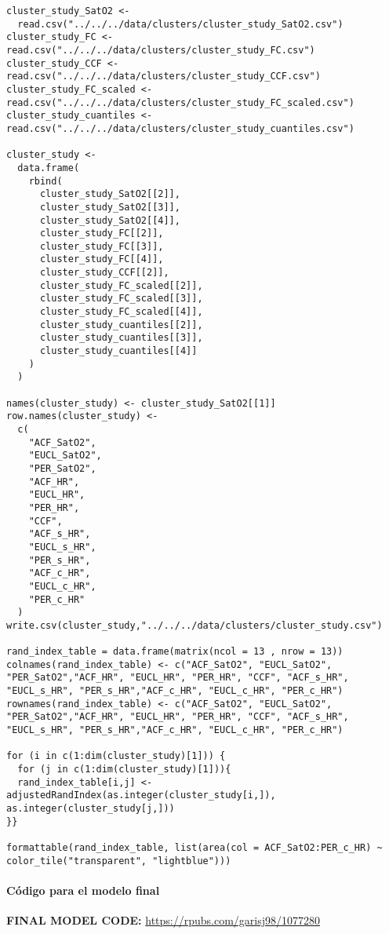 \begin{lstlisting}[style=mystyle,caption={Adjusted Rand Index}, label={lst:input-gower-fun-preprocesamiento}]
    cluster_study_SatO2 <-
  read.csv("../../../data/clusters/cluster_study_SatO2.csv")
cluster_study_FC <- read.csv("../../../data/clusters/cluster_study_FC.csv")
cluster_study_CCF <- read.csv("../../../data/clusters/cluster_study_CCF.csv")
cluster_study_FC_scaled <- read.csv("../../../data/clusters/cluster_study_FC_scaled.csv")
cluster_study_cuantiles <- read.csv("../../../data/clusters/cluster_study_cuantiles.csv")

cluster_study <-
  data.frame(
    rbind(
      cluster_study_SatO2[[2]],
      cluster_study_SatO2[[3]],
      cluster_study_SatO2[[4]],
      cluster_study_FC[[2]],
      cluster_study_FC[[3]],
      cluster_study_FC[[4]],
      cluster_study_CCF[[2]],
      cluster_study_FC_scaled[[2]],
      cluster_study_FC_scaled[[3]],
      cluster_study_FC_scaled[[4]],
      cluster_study_cuantiles[[2]],
      cluster_study_cuantiles[[3]],
      cluster_study_cuantiles[[4]]
    )
  )

names(cluster_study) <- cluster_study_SatO2[[1]]
row.names(cluster_study) <-
  c(
    "ACF_SatO2",
    "EUCL_SatO2",
    "PER_SatO2",
    "ACF_HR",
    "EUCL_HR",
    "PER_HR",
    "CCF",
    "ACF_s_HR",
    "EUCL_s_HR",
    "PER_s_HR",
    "ACF_c_HR",
    "EUCL_c_HR",
    "PER_c_HR"
  )
write.csv(cluster_study,"../../../data/clusters/cluster_study.csv")

rand_index_table = data.frame(matrix(ncol = 13 , nrow = 13))
colnames(rand_index_table) <- c("ACF_SatO2", "EUCL_SatO2", "PER_SatO2","ACF_HR", "EUCL_HR", "PER_HR", "CCF", "ACF_s_HR", "EUCL_s_HR", "PER_s_HR","ACF_c_HR", "EUCL_c_HR", "PER_c_HR")
rownames(rand_index_table) <- c("ACF_SatO2", "EUCL_SatO2", "PER_SatO2","ACF_HR", "EUCL_HR", "PER_HR", "CCF", "ACF_s_HR", "EUCL_s_HR", "PER_s_HR","ACF_c_HR", "EUCL_c_HR", "PER_c_HR")

for (i in c(1:dim(cluster_study)[1])) {
  for (j in c(1:dim(cluster_study)[1])){
  rand_index_table[i,j] <- adjustedRandIndex(as.integer(cluster_study[i,]), as.integer(cluster_study[j,]))
}}

formattable(rand_index_table, list(area(col = ACF_SatO2:PER_c_HR) ~ color_tile("transparent", "lightblue")))
\end{lstlisting}


\paragraph{Código para el modelo final}
\textbf{FINAL MODEL CODE:} \url{https://rpubs.com/garisj98/1077280}